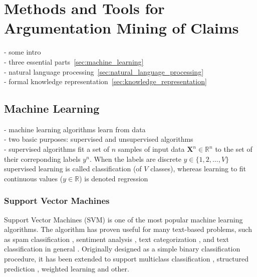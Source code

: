 \chapter{Methods and Tools for Argumentation Mining of Claims}

- some intro \\

- three essential parts~\ref{sec:machine_learning} \\
- natural language processing~\ref{sec:natural_language_processing} \\
- formal knowledge representation~\ref{sec:knowledge_representation} \\


\section{Machine Learning}
\label{sec:unstruc_machine_learning}

- machine learning algorithms learn from data \\
- two basic purposes: supervised and unsupervised algorithms \\
- supervised algorithms fit a set of $n$ samples of 
input data $\textbf{X}^n \in \mathbb{R}^n$ to the set of their correponding 
labels $y^n $. When the labels are discrete $y \in \{1, 2, \dots , V\}$ 
supervised learning is called classification (of $V$ classes), 
whereas learning to fit continuous values ($y \in \mathbb{R}$) 
is denoted regression \\

\subsection{Support Vector Machines}
\label{sec:svm}

Support Vector Machines (SVM) \citep{cortes1995support} is one of the most
popular machine learning algorithms. The algorithm has proven useful for many
text-based problems, such as spam classification \citep{drucker1999support},
sentiment analysis \citep{wang2012baselines}, text categorization
\citep{joachims1998text}, and text classification in general
\citep{tong2001support, ikonomakis2005text}. Originally designed as a simple
binary classification procedure, it has been extended to support multiclass
classification \citep{weston1998multi}, structured prediction
\citep{tsochantaridis2005large}, weighted learning \citep{huang2005weighted} and
other. 

